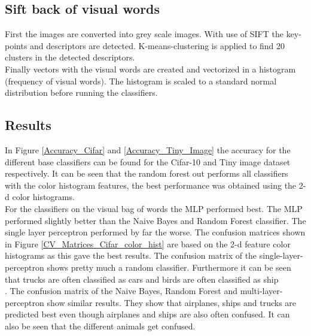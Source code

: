 \documentclass[11pt]{article}
\begin{document}
\subsection{Sift back of visual words}
First the images are converted into grey scale images. With use of SIFT the key-points and descriptors are detected. K-means-clustering is applied to find 20 clusters in the detected descriptors. \\
Finally vectors with the visual words are created and vectorized in a histogram (frequency of visual words). The histogram is scaled to a standard normal distribution before running the classifiers.   
\subsection{Results}
In Figure \ref{Accuracy_Cifar} and \ref{Accuracy_Tiny_Image} the accuracy for the different base classifiers can be found for the Cifar-10 and Tiny image dataset respectively. 
It can be seen that the random forest out performs all classifiers with the color histogram features, the best performance was obtained using the 2-d color histograms.\\
%
For the classifiers on the visual bag of words the MLP performed best. The MLP performed slightly better than the Naive Bayes and Random Forest classifier. The single layer perceptron performed by far the worse. 
%
The confusion matrices shown in Figure \ref{CV_Matrices_Cifar_color_hist} are based on the 2-d feature color histograms as this gave the best results. The confusion matrix of the single-layer-perceptron shows pretty much a random classifier. Furthermore it can be seen that trucks are often classified as cars and birds are often classified as ship\\. 
The confusion matrix of the Naive Bayes, Random Forest and multi-layer-perceptron show similar results. They show that airplanes, ships and trucks are predicted best even though airplanes and ships are also often confused. It can also be seen that the different animals get confused.
\end{document}
